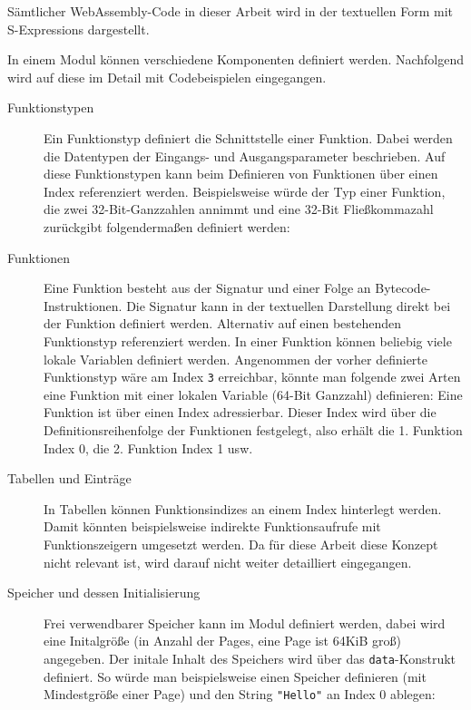 

Sämtlicher WebAssembly-Code in dieser Arbeit wird in der textuellen Form mit S-Expressions dargestellt.

In einem Modul können verschiedene Komponenten definiert werden. Nachfolgend wird auf diese im Detail mit Codebeispielen eingegangen.

\begin{description}
    \item[Funktionstypen] Ein Funktionstyp definiert die Schnittstelle einer Funktion. Dabei werden die Datentypen der Eingangs- und Ausgangsparameter beschrieben. Auf diese Funktionstypen kann beim Definieren von Funktionen über einen Index referenziert werden. Beispielsweise würde der Typ einer Funktion, die zwei 32-Bit-Ganzzahlen annimmt und eine 32-Bit Fließkommazahl zurückgibt folgendermaßen definiert werden: 
    \item[Funktionen] Eine Funktion besteht aus der Signatur und einer Folge an Bytecode-Instruktionen. Die Signatur kann in der textuellen Darstellung direkt bei der Funktion definiert werden. Alternativ auf einen bestehenden Funktionstyp referenziert werden. In einer Funktion können beliebig viele lokale Variablen definiert werden. Angenommen der vorher definierte Funktionstyp wäre am Index \lstinline{3} erreichbar, könnte man folgende zwei Arten eine Funktion mit einer lokalen Variable (64-Bit Ganzzahl) definieren: 
    Eine Funktion ist über einen Index adressierbar. Dieser Index wird über die Definitionsreihenfolge der Funktionen festgelegt, also erhält die 1. Funktion Index 0, die 2. Funktion Index 1 usw.
    \item[Tabellen und Einträge] In Tabellen können Funktionsindizes an einem Index hinterlegt werden. Damit könnten beispielsweise indirekte Funktionsaufrufe mit Funktionszeigern umgesetzt werden. Da für diese Arbeit diese Konzept nicht relevant ist, wird darauf nicht weiter detailliert eingegangen.
    \item[Speicher und dessen Initialisierung] Frei verwendbarer Speicher kann im Modul definiert werden, dabei wird eine Initalgröße (in Anzahl der Pages, eine Page ist 64KiB groß) angegeben. Der initale Inhalt des Speichers wird über das \lstinline{data}-Konstrukt definiert. So würde man beispielsweise einen Speicher definieren (mit Mindestgröße einer Page) und den String \lstinline{"Hello"} an Index 0 ablegen: 

\end{description}
